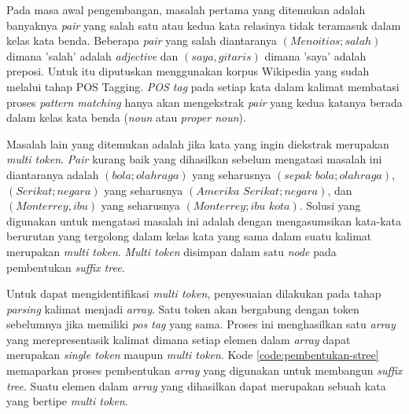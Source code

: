 Pada masa awal pengembangan, masalah pertama yang ditemukan adalah banyaknya \textit{pair} yang salah satu atau kedua kata relasinya tidak teramasuk dalam kelas kata benda. Beberapa \textit{pair} yang salah diantaranya $(Menoitios;salah)$ dimana 'salah' adalah \textit{adjective} dan $(saya,gitaris)$ dimana 'saya' adalah preposi. Untuk itu diputuskan menggunakan korpus Wikipedia yang sudah melalui tahap POS Tagging. \textit{POS tag} pada setiap kata dalam kalimat membatasi proses \textit{pattern matching} hanya akan mengekstrak \textit{pair} yang kedua katanya berada dalam kelas kata benda (\textit{noun} atau \textit{proper noun}). 

Masalah lain yang ditemukan adalah jika kata yang ingin diekstrak merupakan \textit{multi token}. \textit{Pair} kurang baik yang dihasilkan sebelum mengatasi masalah ini diantaranya adalah $(bola;olahraga)$ yang seharusnya $(sepak\,\,bola;olahraga)$, $(Serikat;negara)$ yang seharusnya $(Amerika\,\,Serikat;negara)$, dan $(Monterrey,ibu)$ yang seharusnya $(Monterrey;ibu\,\,kota)$. Solusi yang digunakan untuk mengatasi masalah ini adalah dengan mengasumsikan kata-kata berurutan yang tergolong dalam kelas kata yang sama dalam suatu kalimat merupakan \textit{multi token}. \textit{Multi token} disimpan dalam satu \textit{node} pada pembentukan \textit{suffix tree}.

Untuk dapat mengidentifikasi \textit{multi token}, penyesuaian dilakukan pada tahap \textit{parsing} kalimat menjadi \textit{array}. Satu token akan bergabung dengan token sebelumnya jika memiliki \textit{pos tag} yang sama. Proses ini menghasilkan satu \textit{array} yang merepresentasik kalimat dimana setiap elemen dalam \textit{array} dapat merupakan \textit{single token} maupun \textit{multi token}. Kode \ref{code:pembentukan-stree} memaparkan proses pembentukan \textit{array} yang digunakan untuk membangun \textit{suffix tree}. Suatu elemen dalam \textit{array} yang dihasilkan dapat merupakan sebuah kata yang bertipe \textit{multi token}.


